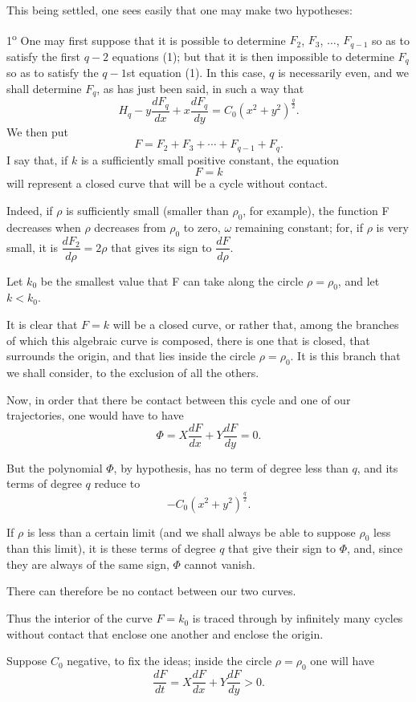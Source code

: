 \documentclass[11pt]{article}
\begin{document}
This being settled, one sees easily that one may make two hypotheses:

1\textsuperscript{o} One may first suppose that it is possible to determine $F_2$, $F_3$, $\ldots$, $F_{q-1}$ so as to satisfy the first $q-2$ equations (1); but that it is then impossible to determine $F_q$ so as to satisfy the $q-1$st equation (1). In this case, $q$ is necessarily even, and we shall determine $F_q$, as has just been said, in such a way that
\[
H_q-y\frac{dF_q}{dx}+x\frac{dF_q}{dy}=C_0(x^2+y^2)^{\frac q2}.
\]
We then put
\[
F=F_2+F_3+\cdots+F_{q-1}+F_q.
\]
I say that, if $k$ is a sufficiently small positive constant, the equation
\[
F=k
\]
will represent a closed curve that will be a cycle without contact.

Indeed, if $\rho$ is sufficiently small (smaller than $\rho_0$, for example), the function F decreases when $\rho$ decreases from $\rho_0$ to zero, $\omega$ remaining constant; for, if $\rho$ is very small, it is $\dfrac{dF_2}{d\rho}=2\rho$ that gives its sign to $\dfrac{dF}{d\rho}$.

Let $k_0$ be the smallest value that F can take along the circle $\rho=\rho_0$, and let $k<k_0$.

It is clear that $F=k$ will be a closed curve, or rather that, among the branches of which this algebraic curve is composed, there is one that is closed, that surrounds the origin, and that lies inside the circle $\rho=\rho_0$. It is this branch that we shall consider, to the exclusion of all the others.

Now, in order that there be contact between this cycle and one of our trajectories, one would have to have
\[
\Phi=X\frac{dF}{dx}+Y\frac{dF}{dy}=0.
\]

But the polynomial $\Phi$, by hypothesis, has no term of degree less than $q$, and its terms of degree $q$ reduce to
\[
-C_0(x^2+y^2)^{\frac q2}.
\]

If $\rho$ is less than a certain limit (and we shall always be able to suppose $\rho_0$ less than this limit), it is these terms of degree $q$ that give their sign to $\Phi$, and, since they are always of the same sign, $\Phi$ cannot vanish.

There can therefore be no contact between our two curves.

Thus the interior of the curve $F=k_0$ is traced through by infinitely many cycles without contact that enclose one another and enclose the origin.

Suppose $C_0$ negative, to fix the ideas; inside the circle $\rho=\rho_0$ one will have
\[
\frac{dF}{dt}=X\frac{dF}{dx}+Y\frac{dF}{dy}>0.
\]
\end{document}
